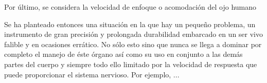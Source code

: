 Por último, se considera la velocidad de enfoque o acomodación del ojo humano



Se ha planteado entonces una situación en la que hay un pequeño problema, un instrumento de gran precisión y prolongada durabilidad embarcado en un ser vivo falible y en ocasiones errático. No sólo esto sino que nunca se llega a dominar por completo el manejo de éste órgano así como su uso en conjunto a las demás partes del cuerpo y siempre todo ello limitado por la velocidad de respuesta que puede proporcionar el sistema nervioso.
Por ejemplo, ...

